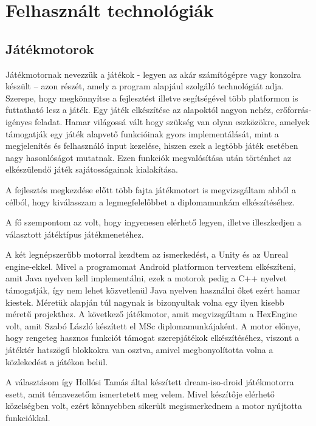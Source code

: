 \section{Felhasznált technológiák}
\label{felhtechnologia}

\subsection{Játékmotorok}
\label{jatekmotor}

Játékmotornak nevezzük a játékok - legyen az akár számítógépre vagy konzolra készült – azon részét, amely a program alapjául szolgáló technológiát adja. 
Szerepe, hogy megkönnyítse a fejlesztést illetve segítségével több platformon is futtatható lesz a játék.
Egy játék elkészítése az alapoktól nagyon nehéz, erőforrás-igényes feladat. 
Hamar világossá vált hogy szükség van olyan eszközökre, amelyek támogatják egy játék alapvető funkcióinak gyors implementálását, mint a megjelenítés és felhasználó input kezelése, hiszen ezek a legtöbb játék esetében nagy hasonlóságot mutatnak. 
Ezen funkciók megvalósítása után történhet az elkészülendő játék sajátosságainak kialakítása.
 
A fejlesztés megkezdése előtt több fajta játékmotort is megvizsgáltam abból a célból, hogy kiválasszam a legmegfelelőbbet a diplomamunkám elkészítéséhez. 

A fő szempontom az volt, hogy ingyenesen elérhető legyen, illetve illeszkedjen a választott játéktípus játékmenetéhez.

A két legnépszerűbb motorral kezdtem az ismerkedést, a Unity és az Unreal engine-ekkel. 
Mivel a programomat Android platformon terveztem elkészíteni, amit Java nyelven kell implementálni, ezek a motorok pedig a C++ nyelvet támogatják, így nem lehet közvetlenül Java nyelven használni őket ezért hamar kiestek. 
Méretük alapján túl nagynak is bizonyultak volna egy ilyen kisebb méretű projekthez. 
A következő játékmotor, amit megvizsgáltam a HexEngine volt, amit Szabó László készített el MSc diplomamunkájaként. 
A motor előnye, hogy rengeteg hasznos funkciót támogat szerepjátékok elkészítéséhez, viszont a játéktér hatszögű blokkokra van osztva, amivel megbonyolította volna a közlekedést a játékon belül.

A választásom így Hollósi Tamás által készített dream-iso-droid játékmotorra esett, amit témavezetőm ismertetett meg velem. 
Mivel készítője elérhető közelségben volt, ezért könnyebben sikerült megismerkednem a motor nyújtotta funkciókkal.

